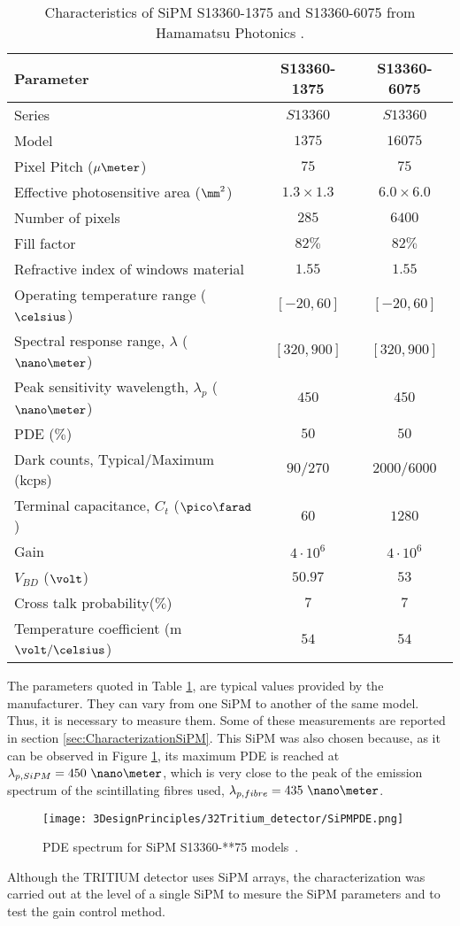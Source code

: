 \begin{table}[htbp]
\centering{}%
\begin{tabular}{lcc}
\toprule 
Parameter & S13360-1375 & S13360-6075 \tabularnewline
\midrule
\midrule 
Series & $S13360$ & $S13360$ \tabularnewline
Model & $1375$ & $16075$ \tabularnewline
Pixel Pitch ($\mu\meter$) & $75$ & $75$ \tabularnewline
Effective photosensitive area ($\mm^2$) & $1.3 \times 1.3$ & $6.0 \times 6.0$ \tabularnewline
Number of pixels & $285$ & $6400$ \tabularnewline
Fill factor & $82\%$ & $82\%$ \tabularnewline
Refractive index of windows material & $1.55$ & $1.55$ \tabularnewline
Operating temperature range ($\celsius$) & $[-20,60]$ & $[-20,60]$ \tabularnewline
Spectral response range, $\lambda$ ($\nano\meter$) & $[320, 900]$ & $[320, 900]$ \tabularnewline
Peak sensitivity wavelength, $\lambda_p$ ($\nano\meter$) & $450$ & $450$ \tabularnewline
PDE ($\%$) & $50$ & $50$ \tabularnewline
Dark counts, Typical/Maximum (kcps) & $90/270$ & $2000/6000$ \tabularnewline
Terminal capacitance, $C_t$ ($\pico\farad$) & $60$ & $1280$ \tabularnewline
Gain & $4 \cdot{} 10^6$ & $4 \cdot{} 10^6$ \tabularnewline
$V_{BD}$ ($\volt$) & $50.97$ & $53$ \tabularnewline
Cross talk probability($\%$) & $7$ & $7$ \tabularnewline
Temperature coefficient (m$\volt/\celsius$) & $54$ & $54$ \tabularnewline
\bottomrule
\end{tabular}
\caption{Characteristics of SiPM S13360-1375 and S13360-6075 from Hamamatsu Photonics \cite{DataSheetHammamatsu_1_SiPM_1375}.}
\label{tab:PropertiesOfSiPM1375}
\end{table}

The parameters quoted in Table \ref{tab:PropertiesOfSiPM1375}, are typical values provided by the manufacturer. They can vary from one SiPM to another of the same model. Thus, it is necessary to measure them. Some of these measurements are reported in section \ref{sec:CharacterizationSiPM}.  This SiPM was also chosen because, as it can be observed in Figure \ref{fig:PDESiPM}, its maximum PDE is reached at $\lambda_{p,SiPM}=450~\nano\meter$, which is very close to the peak of the emission spectrum of the scintillating fibres used, $\lambda_{p,fibre}=435~\nano\meter$.

\begin{figure}[htbp]
\centering
\texttt{[image: 3DesignPrinciples/32Tritium\_detector/SiPMPDE.png]}
\caption{PDE spectrum for SiPM S13360-**75 models~\cite{DataSheetHammamatsu_1_SiPM_1375}.\label{fig:PDESiPM}}
\end{figure}

Although the TRITIUM detector uses SiPM arrays, the characterization was carried out at the level of a single SiPM to mesure the SiPM parameters and to test the gain control method. %